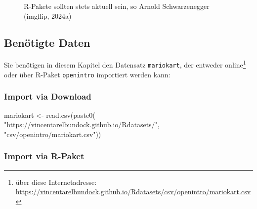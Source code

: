 \documentclass[
  a4paper,
]{scrbook}
\newenvironment{Shaded}{\begin{snugshade}}{\end{snugshade}}
\newcommand{\FunctionTok}[1]{\textcolor[rgb]{0.28,0.35,0.67}{#1}}
\newcommand{\NormalTok}[1]{\textcolor[rgb]{0.00,0.23,0.31}{#1}}
\newcommand{\OtherTok}[1]{\textcolor[rgb]{0.00,0.23,0.31}{#1}}
\newcommand{\StringTok}[1]{\textcolor[rgb]{0.13,0.47,0.30}{#1}}
\theoremstyle{definition}
\theoremstyle{definition}
\theoremstyle{definition}
\theoremstyle{remark}
\begin{document}
\begin{figure}


\caption{\label{fig-arnie}R-Pakete sollten stets aktuell sein, so Arnold
Schwarzenegger (imgflip, 2024a)}

\end{figure}%

\subsection{Benötigte Daten}\label{benuxf6tigte-daten}

Sie benötigen in diesem Kapitel den Datensatz \texttt{mariokart}, der
entweder online\footnote{ über diese Internetadresse:
  \url{https://vincentarelbundock.github.io/Rdatasets/csv/openintro/mariokart.csv}}
oder über R-Paket \texttt{openintro} importiert werden kann:

\subsubsection{Import via Download}\label{import-via-download}

\begin{Shaded}
\begin{Highlighting}[]
\NormalTok{mariokart }\OtherTok{\textless{}{-}} \FunctionTok{read.csv}\NormalTok{(}\FunctionTok{paste0}\NormalTok{(}
  \StringTok{"https://vincentarelbundock.github.io/Rdatasets/"}\NormalTok{,}
  \StringTok{"csv/openintro/mariokart.csv"}\NormalTok{))}
\end{Highlighting}
\end{Shaded}

\subsubsection{Import via R-Paket}\label{import-via-r-paket}
\end{document}
